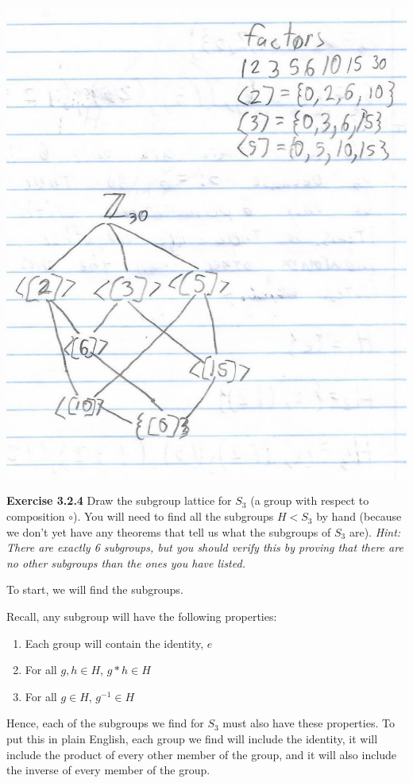 \documentclass[a4paper]{article}
\begin{document}
\begin{myparindent}{0pt}
\includegraphics{lattice-Z30}

\textbf{Exercise 3.2.4}
Draw the subgroup lattice for $S_3$ (a group with respect to composition $\circ$).
You will need to find all the subgroups $H < S_3$ by hand (because we don't yet
have any theorems that tell us what the subgroups of $S_3$ are).
\textit{Hint: There are exactly 6 subgroups, but you should verify this by proving
that there are no other subgroups than the ones you have listed.}
\newline

To start, we will find the subgroups. \newline

Recall, any subgroup will have the following properties:
\begin{enumerate}
  \item Each group will contain the identity, $e$
  \item For all $g, h \in H$, $g * h \in H$
  \item For all $g \in H$, $g^{-1} \in H$
\end{enumerate}

Hence, each of the subgroups we find for $S_3$ must also have these properties.
To put this in plain English, each group we find will include the identity, it
will include the product of every other member of the group, and it will also
include the inverse of every member of the group. \newline


\end{myparindent}
\end{document}
